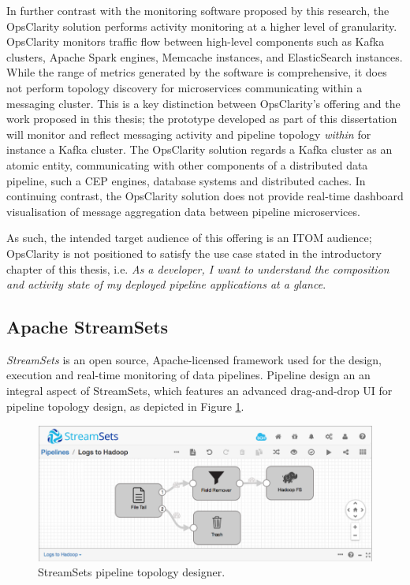 In further contrast with the monitoring software proposed by this research, the OpsClarity solution performs activity monitoring at a higher level of granularity. OpsClarity monitors traffic flow between high-level components such as Kafka clusters, Apache Spark engines, Memcache instances, and ElasticSearch instances. While the range of metrics generated by the software is comprehensive, it does not perform topology discovery for microservices communicating within a messaging cluster. This is a key distinction between OpsClarity's offering and the work proposed in this thesis; the prototype developed as part of this dissertation will monitor and reflect messaging activity and pipeline topology \textit{within} for instance a Kafka cluster. The OpsClarity solution regards a Kafka cluster as an atomic entity, communicating with other components of a distributed data pipeline, such a CEP engines, database systems and distributed caches. In continuing contrast, the OpsClarity solution does not provide real-time dashboard visualisation of message aggregation data between pipeline microservices. 

As such, the intended target audience of this offering is an ITOM audience; OpsClarity is not positioned to satisfy the use case stated in the introductory chapter of this thesis, i.e. \textit{As a developer, I want to understand the composition and activity state of my deployed pipeline applications at a glance}.

\subsection{Apache StreamSets}

\textit{StreamSets} is an open source, Apache-licensed framework used for the design, execution and real-time monitoring of data pipelines. Pipeline design an an integral aspect of StreamSets, which features an advanced drag-and-drop UI for pipeline topology design, as depicted in Figure \ref{streamsets_design_ui}. 

\vspace{5mm}

\begin{figure}[H]
	\centering  
	\includegraphics[scale=2.0]{figures/background/streamsets_design_ui.png}
	\caption{StreamSets pipeline topology designer.}
	\label{streamsets_design_ui}
\end{figure}

